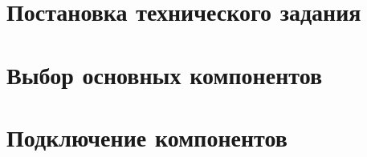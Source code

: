\chapter{Постановка технического задания}



\chapter{Выбор основных компонентов}











\chapter{Подключение компонентов}











